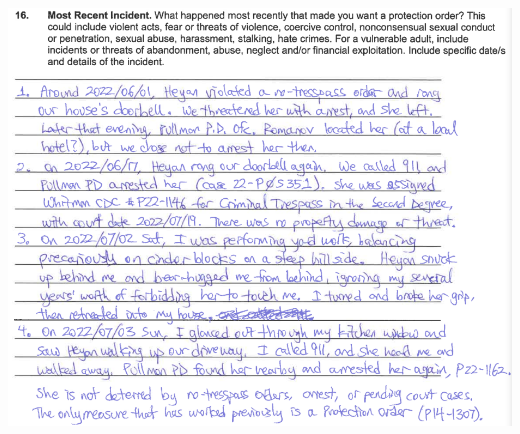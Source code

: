\documentclass[9pt, b5paper]{article}
\begin{document}
\includegraphics[width=.9\linewidth]{./pic/dearCousin_20220919_183412.png}
\end{document}
